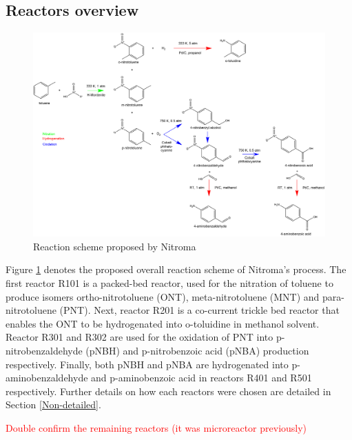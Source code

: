 \subsection{Reactors overview}
\begin{figure}[h]
    \centering
    \includegraphics[width=\linewidth]{chapters/2-reaction/figures/routes-chosen_20210220.png}
    \caption{Reaction scheme proposed by Nitroma}
    \label{fig:finalroutes}
\end{figure}
Figure \ref{fig:finalroutes} denotes the proposed overall reaction scheme of Nitroma's process. The first reactor R101 is a packed-bed reactor, used for the nitration of toluene to produce isomers ortho-nitrotoluene (ONT), meta-nitrotoluene (MNT) and para-nitrotoluene (PNT). Next, reactor R201 is a co-current trickle bed reactor that enables the ONT to be hydrogenated into o-toluidine in methanol solvent. Reactor R301 and R302 are used for the oxidation of PNT into p-nitrobenzaldehyde (pNBH) and p-nitrobenzoic acid (pNBA) production respectively. Finally, both pNBH and pNBA are hydrogenated into p-aminobenzaldehyde and p-aminobenzoic acid in reactors R401 and R501 respectively. Further details on how each reactors were chosen are detailed in Section \ref{Non-detailed}. 



\textcolor{red}{Double confirm the remaining reactors (it was microreactor previously)} 




